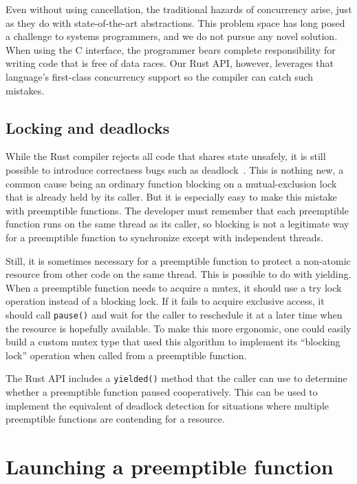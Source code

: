 Even without using cancellation, the traditional hazards of concurrency arise, just
as they do with state-of-the-art abstractions.  This problem space has long posed a
challenge to systems programmers, and we do not pursue any novel solution.  When
using the C interface, the programmer bears complete responsibility for writing code
that is free of data races.  Our Rust API, however, leverages that language's
first-class concurrency support so the compiler can catch such mistakes.


\subsection{Locking and deadlocks}

While the Rust compiler rejects all code that shares state unsafely, it is still
possible to introduce correctness bugs such as deadlock~\cite{www-rustlang-nu}.  This
is nothing new, a common cause being an ordinary function blocking on a
mutual-exclusion lock that is already held by its caller.  But it is especially easy
to make this mistake with preemptible functions.  The developer must remember that
each preemptible function runs on the same thread as its caller, so blocking is not a
legitimate way for a preemptible function to synchronize except with independent
threads.

Still, it is sometimes necessary for a preemptible function to protect a non-atomic
resource from other code on the same thread.  This is possible to do with yielding.
When a preemptible function needs to acquire a mutex, it should use a try lock
operation instead of a blocking lock.  If it fails to acquire exclusive access, it
should call \texttt{pause()} and wait for the caller to reschedule it at a later time
when the resource is hopefully available.  To make this more ergonomic, one could
easily build a custom mutex type that used this algorithm to implement its ``blocking
lock'' operation when called from a preemptible function.

The Rust API includes a \texttt{yielded()} method that the caller can use to
determine whether a preemptible function paused cooperatively.  This can be used to
implement the equivalent of deadlock detection for situations where multiple
preemptible functions are contending for a resource.


\section{Launching a preemptible function}

